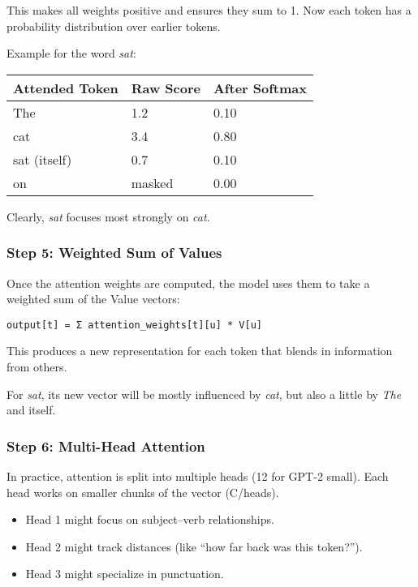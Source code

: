 \documentclass[
  letterpaper,
  DIV=11,
  numbers=noendperiod]{scrreprt}
\providecommand{\tightlist}{%
  \setlength{\itemsep}{0pt}\setlength{\parskip}{0pt}}
\begin{document}
This makes all weights positive and ensures they sum to 1. Now each
token has a probability distribution over earlier tokens.

Example for the word \emph{sat}:

\begin{longtable}[]{@{}lll@{}}
\toprule\noalign{}
Attended Token & Raw Score & After Softmax \\
\midrule\noalign{}
\endhead
\bottomrule\noalign{}
\endlastfoot
The & 1.2 & 0.10 \\
cat & 3.4 & 0.80 \\
sat (itself) & 0.7 & 0.10 \\
on & masked & 0.00 \\
\end{longtable}

Clearly, \emph{sat} focuses most strongly on \emph{cat}.

\subsubsection{Step 5: Weighted Sum of
Values}\label{step-5-weighted-sum-of-values}

Once the attention weights are computed, the model uses them to take a
weighted sum of the Value vectors:

\begin{verbatim}
output[t] = Σ attention_weights[t][u] * V[u]
\end{verbatim}

This produces a new representation for each token that blends in
information from others.

For \emph{sat}, its new vector will be mostly influenced by \emph{cat},
but also a little by \emph{The} and itself.

\subsubsection{Step 6: Multi-Head
Attention}\label{step-6-multi-head-attention}

In practice, attention is split into multiple heads (12 for GPT-2
small). Each head works on smaller chunks of the vector (C/heads).

\begin{itemize}
\tightlist
\item
  Head 1 might focus on subject--verb relationships.
\item
  Head 2 might track distances (like ``how far back was this token?'').
\item
  Head 3 might specialize in punctuation.
\end{itemize}
\end{document}
